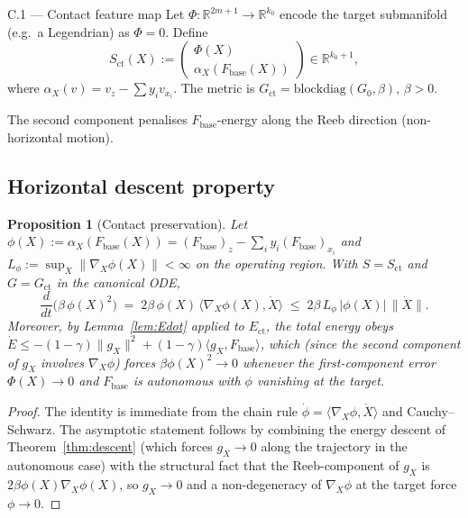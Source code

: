 \documentclass[11pt,oneside]{amsart}
\theoremstyle{plain}
\newtheorem{proposition}[theorem]{Proposition}
\theoremstyle{definition}
\newcommand{\Xdot}{\dot{X}}
\newcommand{\gX}{g_X}
\newcommand{\Fbase}{F_{\mathrm{base}}}
\newcommand{\R}{\mathbb{R}}
\begin{document}
\begin{defbox}{C.1 --- Contact feature map}
Let $\Phi:\R^{2m+1}\to\R^{k_{0}}$ encode the target submanifold
(e.g.\ a Legendrian) as $\Phi=0$. Define
\[
  S_{\mathrm{ct}}(X) :=
  \begin{pmatrix} \Phi(X) \\ \alpha_{X}(\Fbase(X)) \end{pmatrix}
  \in \R^{k_{0}+1},
\]
where $\alpha_{X}(v) = v_{z}-\sum y_{i}v_{x_{i}}$. The metric is
$G_{\mathrm{ct}} = \mathrm{blockdiag}(G_{0},\beta)$, $\beta>0$.
\end{defbox}

The second component penalises $\Fbase$-energy along the Reeb
direction (non-horizontal motion).

\subsection{Horizontal descent property}

\begin{proposition}[Contact preservation]
\label{prop:contact}
Let $\phi(X) := \alpha_{X}(\Fbase(X)) = (\Fbase)_{z} - \sum_{i} y_{i}(\Fbase)_{x_{i}}$
and $L_{\phi} := \sup_{X}\|\nabla_{X}\phi(X)\|<\infty$ on the operating region.
With $S=S_{\mathrm{ct}}$ and $G=G_{\mathrm{ct}}$ in the canonical ODE,
\[
  \frac{d}{dt}\bigl(\beta\,\phi(X)^{2}\bigr)
  \;=\; 2\beta\,\phi(X)\,\langle\nabla_{X}\phi(X),\Xdot\rangle
  \;\le\; 2\beta\,L_{\phi}\,|\phi(X)|\,\|\Xdot\|.
\]
Moreover, by Lemma~\ref{lem:Edot} applied to $E_{\mathrm{ct}}$, the
total energy obeys $\dot E\le -(1-\gamma)\|\gX\|^{2}+(1-\gamma)\langle\gX,\Fbase\rangle$,
which (since the second component of $\gX$ involves $\nabla_{X}\phi$)
forces $\beta\phi(X)^{2}\to 0$ whenever the first-component error
$\Phi(X)\to 0$ and $\Fbase$ is autonomous with $\phi$ vanishing at the
target.
\end{proposition}

\begin{proof}
The identity is immediate from the chain rule
$\dot\phi = \langle\nabla_{X}\phi,\Xdot\rangle$ and Cauchy--Schwarz.
The asymptotic statement follows by combining the energy descent of
Theorem~\ref{thm:descent} (which forces $\gX\to 0$ along the
trajectory in the autonomous case) with the structural fact that the
Reeb-component of $\gX$ is $2\beta\phi(X)\nabla_{X}\phi(X)$, so
$\gX\to 0$ and a non-degeneracy of $\nabla_{X}\phi$ at the target
force $\phi\to 0$.
\end{proof}
\end{document}
